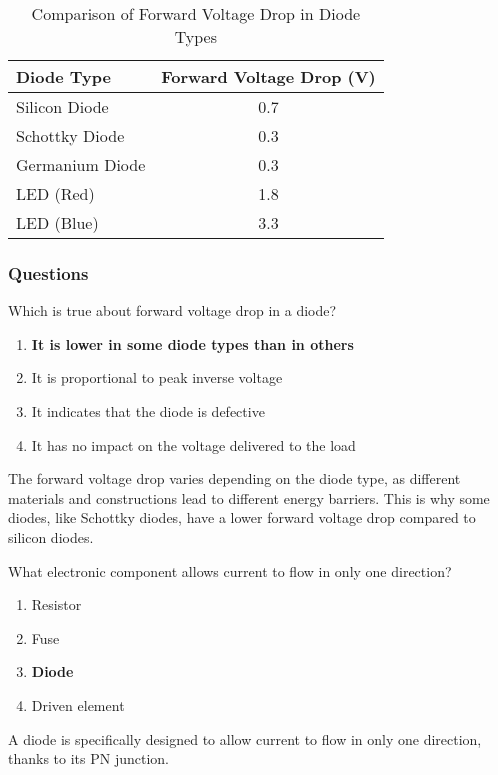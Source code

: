 \begin{table}[h]
    \centering
    \caption{Comparison of Forward Voltage Drop in Diode Types}
    \label{tab:forward_voltage_comparison}
    \begin{tabular}{|l|c|}
        \hline
        \textbf{Diode Type} & \textbf{Forward Voltage Drop (V)} \\
        \hline
        Silicon Diode & 0.7 \\
        Schottky Diode & 0.3 \\
        Germanium Diode & 0.3 \\
        LED (Red) & 1.8 \\
        LED (Blue) & 3.3 \\
        \hline
    \end{tabular}
\end{table}

\subsubsection*{Questions}

\begin{tcolorbox}[colback=gray!10!white,colframe=black!75!black,title={T6B01}]
    Which is true about forward voltage drop in a diode?
    \begin{enumerate}[label=\Alph*),noitemsep]
        \item \textbf{It is lower in some diode types than in others}
        \item It is proportional to peak inverse voltage
        \item It indicates that the diode is defective
        \item It has no impact on the voltage delivered to the load
    \end{enumerate}
\end{tcolorbox}
The forward voltage drop varies depending on the diode type, as different materials and constructions lead to different energy barriers. This is why some diodes, like Schottky diodes, have a lower forward voltage drop compared to silicon diodes.

\begin{tcolorbox}[colback=gray!10!white,colframe=black!75!black,title={T6B02}]
    What electronic component allows current to flow in only one direction?
    \begin{enumerate}[label=\Alph*),noitemsep]
        \item Resistor
        \item Fuse
        \item \textbf{Diode}
        \item Driven element
    \end{enumerate}
\end{tcolorbox}
A diode is specifically designed to allow current to flow in only one direction, thanks to its PN junction.

